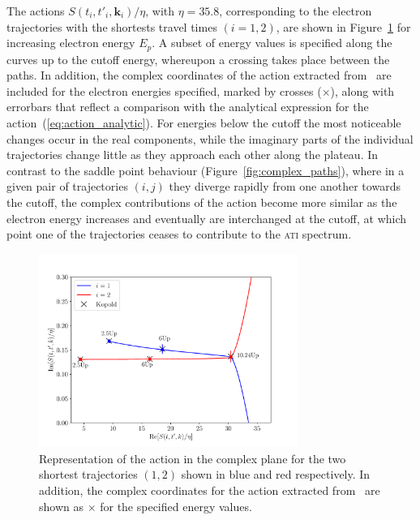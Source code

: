 The actions $S(t_{i},t'_{i},\mathbf{k}_{i})/\eta$, with $\eta = 35.8$,
corresponding to the electron trajectories with the shortests travel
times $(i = 1, 2)$, are shown in Figure~\ref{fig:phase_ReIm} for
increasing electron energy $E_{p}$. A subset of energy values is
specified along the curves up to the cutoff energy, whereupon a
crossing takes place between the paths. In addition, the complex
coordinates of the action extracted from~\cite{phd_Kopold} are
included for the electron energies specified, marked by crosses
($\times$), along with errorbars that reflect a comparison with the
analytical expression for the action~(\ref{eq:action_analytic}). For
energies below the cutoff the most noticeable changes occur in the
real components, while the imaginary parts of the individual
trajectories change little as they approach each other along the
plateau. In contrast to the saddle point behaviour
(Figure~\ref{fig:complex_paths}), where in a given pair of
trajectories $(i, j)$ they diverge rapidly from one another towards
the cutoff, the complex contributions of the action become more
similar as the electron energy increases and eventually are
interchanged at the cutoff, at which point one of the trajectories
ceases to contribute to the \textsc{ati} spectrum.

\begin{figure}
  \centering \includegraphics[width =
    0.75\textwidth]{figures/ch_ATI_SPA/rescattering/phase_ComplexReIm.pdf}
  \caption{Representation of the action in the complex plane for the
    two shortest trajectories $(1, 2)$ shown in blue and red
    respectively. In addition, the complex coordinates for the action
    extracted from~\cite{phd_Kopold} are shown as $\times$ for the
    specified energy values.}
  \label{fig:phase_ReIm}
\end{figure}


